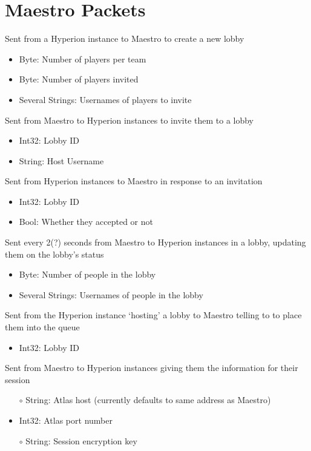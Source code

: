 \documentclass[10pt,a4paper]{scrreprt}
\begin{document}
	\section{Maestro Packets}
	\begin{description}[leftmargin=!,labelwidth=0.35\textwidth, itemsep=2ex]
		\item[Create Lobby]
			Sent from a Hyperion instance to Maestro to create a new lobby
			\begin{itemize}
				\item Byte: Number of players per team
				\item Byte: Number of players invited
				\item Several Strings: Usernames of players to invite
			\end{itemize}
		\item[Invite To Lobby]
			Sent from Maestro to Hyperion instances to invite them to a lobby
			\begin{itemize}
				\item Int32: Lobby ID
				\item String: Host Username
			\end{itemize}
		\item[Reply To Lobby Invite]
			Sent from Hyperion instances to Maestro in response to an invitation
			\begin{itemize}
				\item Int32: Lobby ID
				\item Bool: Whether they accepted or not
			\end{itemize}
		\item[Lobby Status]
			Sent every 2(?) seconds from Maestro to Hyperion instances in a lobby, updating them on the lobby's status
			\begin{itemize}
				\item Byte: Number of people in the lobby
				\item Several Strings: Usernames of people in the lobby
			\end{itemize}
		\item[Start Lobby]
			Sent from the Hyperion instance `hosting' a lobby to Maestro telling to to place them into the queue
			\begin{itemize}
				\item Int32: Lobby ID
			\end{itemize}
		\item[Introduce Atlas]
			Sent from Maestro to Hyperion instances giving them the information for their session
			\begin{itemize}
				\item [$\circ$] String: Atlas host (currently defaults to same address as Maestro)
				\item Int32: Atlas port number
				\item[$\circ$] String: Session encryption key
			\end{itemize}
	\end{description}
\end{document}
